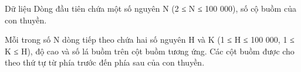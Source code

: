 Dữ liệu  
Dòng đầu tiên chứa một số nguyên N (2 ≤ N ≤ 100 000), số cộ buồm của con thuyền.  

   Mỗi trong số N dòng tiếp theo chứa hai số nguyên H và K (1 ≤ H ≤ 100 000, 1 ≤ K ≤ H), độ cao và số lá buồm trên cột buồm tương ứng. Các cột buồm được cho theo thứ tự từ phía trước đến phía sau của con thuyền.